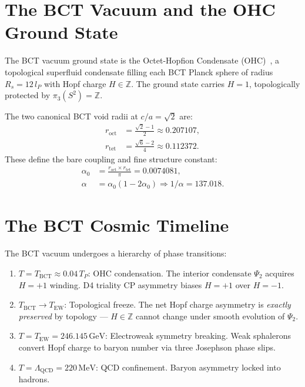 \documentclass[aps,prl,twocolumn,superscriptaddress,showpacs]{revtex4-2}
\begin{document}
\section{The BCT Vacuum and the OHC Ground State}

The BCT vacuum ground state is the Octet-Hopfion Condensate (OHC)~\cite{BCT_AppJH},
a topological superfluid condensate filling each BCT Planck sphere of radius 
$R_s = 12\,l_P$ with Hopf charge $H \in \mathbb{Z}$. The ground state carries 
$H = 1$, topologically protected by $\pi_3(S^2) = \mathbb{Z}$.

The two canonical BCT void radii at $c/a = \sqrt{2}$ are:
\begin{align}
r_\mathrm{oct} &= \frac{\sqrt{2}-1}{2} \approx 0.207107, \\
r_\mathrm{tet} &= \frac{\sqrt{6}-2}{4} \approx 0.112372.
\end{align}
These define the bare coupling and fine structure constant:
\begin{align}
\alpha_0 &= \frac{r_\mathrm{oct}\times r_\mathrm{tet}}{\pi} = 0.0074081, \\
\alpha &= \alpha_0(1-2\alpha_0) \Rightarrow 1/\alpha = 137.018.
\end{align}

\section{The BCT Cosmic Timeline}

The BCT vacuum undergoes a hierarchy of phase transitions:

\begin{enumerate}
\item \textbf{$T = T_\mathrm{BCT} \approx 0.04\,T_P$}: OHC condensation. 
The interior condensate $\Psi_2$ acquires $H = +1$ winding. D4 triality 
CP asymmetry biases $H = +1$ over $H = -1$.

\item \textbf{$T_\mathrm{BCT} \to T_\mathrm{EW}$}: Topological freeze. 
The net Hopf charge asymmetry is \emph{exactly preserved} by topology --- 
$H \in \mathbb{Z}$ cannot change under smooth evolution of $\Psi_2$.

\item \textbf{$T = T_\mathrm{EW} = 246.145\,\mathrm{GeV}$}: Electroweak 
symmetry breaking. Weak sphalerons convert Hopf charge to baryon number 
via three Josephson phase slips.

\item \textbf{$T = \Lambda_\mathrm{QCD} = 220\,\mathrm{MeV}$}: QCD 
confinement. Baryon asymmetry locked into hadrons.
\end{enumerate}
\end{document}
